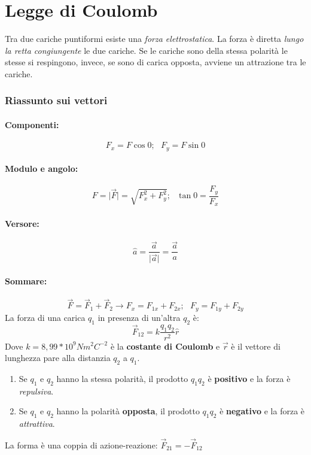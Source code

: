 \documentclass{book}
\newcommand{\abs}[1]{\lvert#1\rvert}
\begin{document}
\section{Legge di Coulomb}
Tra due cariche puntiformi esiste una \textit{forza elettrostatica}. La forza è
diretta \textit{lungo la retta congiungente} le due cariche.
Se le cariche sono della stessa polarità le stesse si respingono, invece, se
sono di carica opposta, avviene un attrazione tra le cariche.
\subsubsection{Riassunto sui vettori}
\paragraph{Componenti:}
\begin{equation}
	F_x=F\cos 0;\text{ }F_y=F\sin 0
\end{equation}
\paragraph{Modulo e angolo:}
\begin{equation}
	F=\abs{\vec{F}}=\sqrt{F_x^2+F_y^2};\text{ } \tan 0 =\frac{F_y}{F_x}
\end{equation}
\paragraph{Versore:}
\begin{equation}
	\hat{a}=\frac{\vec{a}}{\abs{\vec{a}}}=\frac{\vec{a}}{a}
\end{equation}
\paragraph{Sommare:}
\begin{equation}
	\vec{F}=\vec{F}_1+\vec{F}_2\to F_x=F_{1x}+F_{2x};\text{ } F_y=F_{1y}+F_{2y}
\end{equation}
La forza di una carica $q_1$ in presenza di un'altra $q_2$ è:
\begin{equation}
	\vec{F}_{12}=k\frac{q_1q_2}{r^2}\hat{r}
\end{equation}
Dove $k=8,99*10^9Nm^2C^{-2}$ è la \textbf{costante di Coulomb} e $\vec{r}$ è il
vettore di lunghezza pare alla distanzia $q_2$ a $q_1$.
\begin{enumerate}
	\item Se $q_1$ e $q_2$ hanno la stessa polarità, il prodotto $q_1q_2$ è 
		\textbf{positivo} e la forza è \textit{repulsiva}.
	\item Se $q_1$ e $q_2$ hanno la polarità \textbf{opposta}, il
		prodotto $q_1q_2$ è \textbf{negativo} e la forza è \textit{attrattiva}.
\end{enumerate}
La forma è una coppia di azione-reazione: $\vec{F}_{21}=-\vec{F}_{12}$
\end{document}
